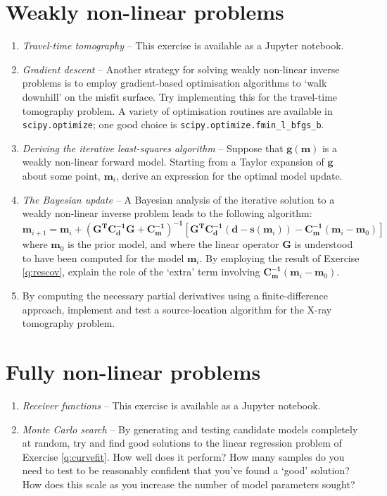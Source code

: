 \documentclass[a4paper,11pt]{article}
\begin{document}
\section{Weakly non-linear problems}
\begin{enumerate}[resume]
\item \textit{Travel-time tomography} -- This exercise is available as a Jupyter notebook.
\item \textit{Gradient descent} -- Another strategy for solving weakly non-linear inverse problems is to employ gradient-based optimisation algorithms to `walk downhill' on the misfit surface. Try implementing this for the travel-time tomography problem. A variety of optimisation routines are available in \texttt{scipy.optimize}; one good choice is \texttt{scipy.optimize.fmin\_l\_bfgs\_b}.
\item \textit{Deriving the iterative least-squares algorithm} -- Suppose that $\mathbf{g(m)}$ is a weakly non-linear forward model. Starting from a Taylor expansion of $\mathbf{g}$ about some point, $\mathbf{m}_i$, derive an expression for the optimal model update.
\item \textit{The Bayesian update} -- A Bayesian analysis of the iterative solution to a weakly non-linear inverse problem leads to the following algorithm:
\[\mathbf{m}_{i+1} = \mathbf{m}_i + \left(\mathbf{G^TC_d^{-1}G + C_m^{-1}}\right)^\mathbf{-1}\left[\mathbf{G^TC_d^{-1}}\left(\mathbf{d}-\mathbf{s}(\mathbf{m}_i)\right) - \mathbf{C_m^{-1}}\left(\mathbf{m}_i - \mathbf{m}_0\right)\right] \]
where $\mathbf{m}_0$ is the prior model, and where the linear operator $\mathbf{G}$ is understood to have been computed for the model $\mathbf{m}_i$. By employing the result of Exercise \ref{q:rescov}, explain the role of the `extra' term involving $\mathbf{C_m^{-1}}\left(\mathbf{m}_i - \mathbf{m}_0\right)$.
\item By computing the necessary partial derivatives using a finite-difference approach, implement and test a source-location algorithm for the X-ray tomography problem. \label{q:xraysrc}
\end{enumerate}

 
\section{Fully non-linear problems}
\begin{enumerate}[resume]
\item \textit{Receiver functions} -- This exercise is available as a Jupyter notebook.
\item \textit{Monte Carlo search} -- By generating and testing candidate models completely at random, try and find good solutions to the linear regression problem of Exercise \ref{q:curvefit}. How well does it perform? How many samples do you need to test to be reasonably confident that you've found a `good' solution? How does this scale as you increase the number of model parameters sought?
\end{enumerate}
\end{document}
